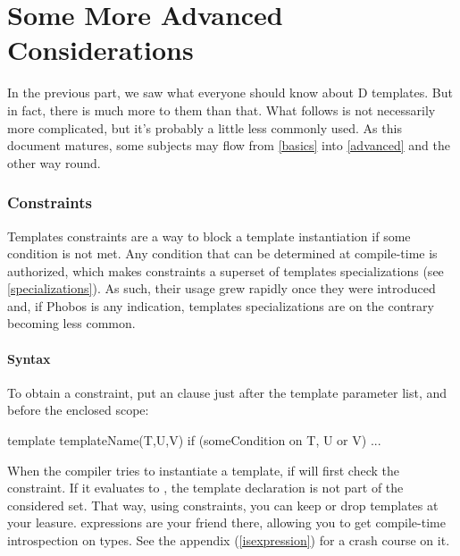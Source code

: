\newpage
\part{Some More Advanced Considerations}\label{advanced} %

In the previous part, we saw what everyone should know about D templates. But in fact, there is much more to them than that. What follows is not necessarily more complicated, but it's probably a little less commonly used. As this document matures, some subjects may flow from \autoref{basics} into \autoref{advanced} and the other way round.

\section{Constraints}\label{constraints}

Templates constraints are a way to block a template instantiation if some condition is not met. Any condition that can be determined at compile-time is authorized, which makes constraints a superset of templates specializations (see \ref{specializations}). As such, their usage grew rapidly once they were introduced and, if Phobos is any indication, templates specializations are on the contrary becoming less common.

\subsection{Syntax}\label{constraintssyntax}

To obtain a constraint, put an  clause just after the template parameter list, and before the enclosed scope:

\begin{dcode}
template templateName(T,U,V) if (someCondition on T, U or V)
{
   ...
}
\end{dcode}

When the compiler tries to instantiate a template, if will first check the constraint. If it evaluates to , the template declaration is not part of the considered set. That way, using constraints, you can keep or drop templates at your leasure.  expressions are your friend there, allowing you to get compile-time introspection on types. See the appendix (\ref{isexpression}) for a crash course on it. 

